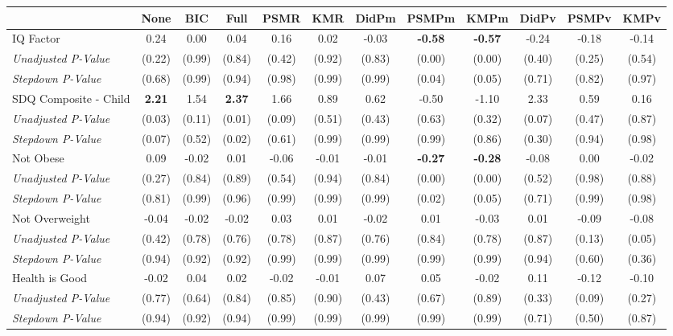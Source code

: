 \begin{tabular}{l c c c c c c c c c c c}
\toprule
 & None & BIC & Full & PSMR & KMR & DidPm & PSMPm & KMPm & DidPv & PSMPv & KMPv \\
\midrule
IQ Factor & 0.24 & 0.00 & 0.04 & 0.16 & 0.02 & -0.03 & \textbf{ -0.58 } & \textbf{ -0.57 } & -0.24 & -0.18 & -0.14 \\
\quad \textit{Unadjusted P-Value} & (0.22) & (0.99) & (0.84) & (0.42) & (0.92) & (0.83) & (0.00) & (0.00) & (0.40) & (0.25) & (0.54) \\
\quad \textit{Stepdown P-Value} & (0.68) & (0.99) & (0.94) & (0.98) & (0.99) & (0.99) & (0.04) & (0.05) & (0.71) & (0.82) & (0.97) \\
SDQ Composite - Child & \textbf{ 2.21 } & 1.54 & \textbf{ 2.37 } & 1.66 & 0.89 & 0.62 & -0.50 & -1.10 & 2.33 & 0.59 & 0.16 \\
\quad \textit{Unadjusted P-Value} & (0.03) & (0.11) & (0.01) & (0.09) & (0.51) & (0.43) & (0.63) & (0.32) & (0.07) & (0.47) & (0.87) \\
\quad \textit{Stepdown P-Value} & (0.07) & (0.52) & (0.02) & (0.61) & (0.99) & (0.99) & (0.99) & (0.86) & (0.30) & (0.94) & (0.98) \\
Not Obese & 0.09 & -0.02 & 0.01 & -0.06 & -0.01 & -0.01 & \textbf{ -0.27 } & \textbf{ -0.28 } & -0.08 & 0.00 & -0.02 \\
\quad \textit{Unadjusted P-Value} & (0.27) & (0.84) & (0.89) & (0.54) & (0.94) & (0.84) & (0.00) & (0.00) & (0.52) & (0.98) & (0.88) \\
\quad \textit{Stepdown P-Value} & (0.81) & (0.99) & (0.96) & (0.99) & (0.99) & (0.99) & (0.02) & (0.05) & (0.71) & (0.99) & (0.98) \\
Not Overweight & -0.04 & -0.02 & -0.02 & 0.03 & 0.01 & -0.02 & 0.01 & -0.03 & 0.01 & -0.09 & -0.08 \\
\quad \textit{Unadjusted P-Value} & (0.42) & (0.78) & (0.76) & (0.78) & (0.87) & (0.76) & (0.84) & (0.78) & (0.87) & (0.13) & (0.05) \\
\quad \textit{Stepdown P-Value} & (0.94) & (0.92) & (0.92) & (0.99) & (0.99) & (0.99) & (0.99) & (0.99) & (0.94) & (0.60) & (0.36) \\
Health is Good & -0.02 & 0.04 & 0.02 & -0.02 & -0.01 & 0.07 & 0.05 & -0.02 & 0.11 & -0.12 & -0.10 \\
\quad \textit{Unadjusted P-Value} & (0.77) & (0.64) & (0.84) & (0.85) & (0.90) & (0.43) & (0.67) & (0.89) & (0.33) & (0.09) & (0.27) \\
\quad \textit{Stepdown P-Value} & (0.94) & (0.92) & (0.94) & (0.99) & (0.99) & (0.99) & (0.99) & (0.99) & (0.71) & (0.50) & (0.87) \\

\end{tabular}
